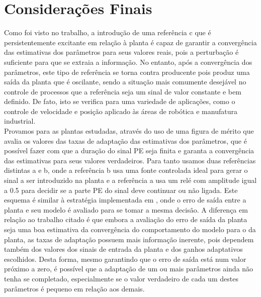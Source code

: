 \documentclass[
	12pt,				%
	openright,			%
	twoside,			%
	a4paper,			%
	english,			%
	french,				%
	spanish,			%
	brazil				%
	]{abntex2}
\begin{document}

\chapter{Considerações Finais}

Como foi visto no trabalho, a introdução de uma referência c que é persistentemente excitante em relação à planta é capaz de garantir a convergência das estimativas dos parâmetros para seus valores reais, pois a perturbação é suficiente para que se extraia a informação. No entanto, após a convergência dos parâmetros, este tipo de referência se torna contra producente pois produz uma saída da planta que é oscilante, sendo a situação mais comumente desejável no controle de processos que a referência seja um sinal de valor constante e bem definido. De fato, isto se verifica para uma variedade de aplicações, como o controle de velocidade e posição aplicado às áreas de robótica e manufatura industrial.\\

Provamos para as plantas estudadas, através do uso de uma figura de mérito que avalia os valores das taxas de adaptação das estimativas dos parâmetros, que é possível fazer com que a duração do sinal PE seja finita e garanta a convergência das estimativas para seus valores verdadeiros. Para tanto usamos duas referências distintas a e b, onde a referência b usa uma fonte controlada ideal para gerar o sinal a ser introduzido na planta e a referência a usa um relé com amplitude igual a 0.5 para decidir se a parte PE do sinal deve continuar ou não ligada. Este esquema é similar à estratégia implementada em \cite{naval}, onde o erro de saída entre a planta e seu modelo é avaliado para se tomar a mesma decisão. A diferença em relação ao trabalho citado é que embora a avaliação do erro de saída da planta seja uma boa estimativa da convergência do comportamento do modelo para o da planta, as taxas de adaptação possuem mais informação inerente, pois dependem também dos valores dos sinais de entrada da planta e dos ganhos adaptativos escolhidos. Desta forma, mesmo garantindo que o erro de saída está num valor próximo a zero, é possível que a adaptação de um ou mais parâmetros ainda não tenha se completado, especialmente se o valor verdadeiro de cada um destes parâmetros é pequeno em relação aos demais.\\
\end{document}
